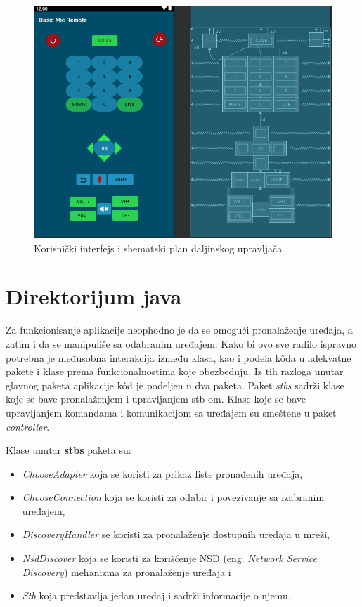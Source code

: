 \documentclass[implementacija.tex]{subfiles}
\begin{document}
\begin{figure}[!ht]
  \centering
  \label{fig:remoteScena}
  \includegraphics[width=\textwidth]{Implementacija/remote_control_scene.png}
  \caption{Korisnički interfejs i shematski plan daljinskog upravljača}
\end{figure}


\section{Direktorijum java}
Za funkcionisanje aplikacije neophodno je da se omogući pronalaženje uređaja, a zatim i da se manipuliše sa odabranim uređajem. Kako bi ovo sve radilo ispravno potrebna je međusobna interakcija između klasa, kao i podela k\^{o}da u adekvatne pakete i klase prema funkcionalnostima koje obezbeđuju. Iz tih razloga unutar glavnog paketa aplikacije k\^{o}d je podeljen u dva paketa. Paket \textit{stbs} sadrži klase koje se bave pronalaženjem i upravljanjem stb-om. Klase koje se bave upravljanjem komandama i komunikacijom sa uređajem su smeštene u paket \textit{controller}. 

Klase unutar \textbf{stbs} paketa su:
\begin{itemize}
\item \textit{ChooseAdapter} koja se koristi za prikaz liste pronađenih uređaja,
\item \textit{ChooseConnection} koja se koristi za odabir i povezivanje sa izabranim uređajem,
\item \textit{DiscoveryHandler} se koristi za pronalaženje dostupnih uređaja u mreži,
\item \textit{NsdDiscover} koja se koristi za korišćenje NSD (eng. \textit{Network Service Discovery}) mehanizma za pronalaženje uređaja i
\item \textit{Stb} koja predstavlja jedan uređaj i sadrži informacije o njemu.
\end{itemize}
\end{document}
